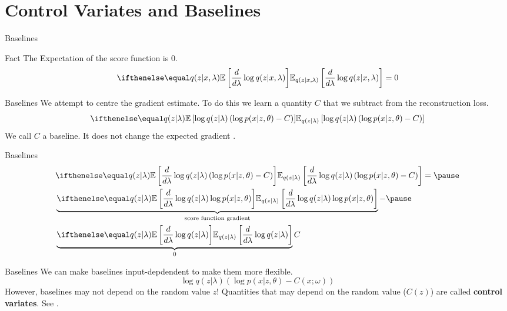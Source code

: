 \documentclass[14pt]{beamer}
\begin{document}
\section{Control Variates and Baselines}

\begin{frame}
\tableofcontents[currentsection]
\end{frame}

\begin{frame}{Baselines}
\begin{block}{Fact}
The Expectation of the score function is 0. 
\pause
\begin{equation*}
\E[q(z|x,\lambda)]{\frac{d}{d\lambda} \log q(z|x,\lambda)} = 0
\end{equation*}
\end{block}
\end{frame}

\begin{frame}{Baselines}
We attempt to centre the gradient estimate. To do this we learn a quantity $ C $ that we subtract
from the reconstruction loss.
\begin{equation*}
\E[q(z|\lambda) ]{\log q(z|\lambda) \left( \log p(x|z,\theta) - C \right)}
\end{equation*}
We call $ C $ a baseline. It does not change the expected gradient \citep{Williams:1992}.
\end{frame}

\begin{frame}{Baselines}
 \begin{equation*}
\begin{aligned}
&\E[q(z|\lambda)]{\frac{d}{d\lambda}\log q(z|\lambda) \left( \log p(x|z,\theta) - C \right)} = \pause \\
&\underbrace{\E[q(z|\lambda)]{\frac{d}{d\lambda}\log q(z|\lambda)  \log p(x|z,\theta)}}_{\text{score function gradient}}  -
\pause \\
&\underbrace{\E[q(z|\lambda)]{\frac{d}{d\lambda}\log q(z|\lambda)}}_{0}C
\end{aligned}
\end{equation*}
\end{frame}

\begin{frame}{Baselines}
We can make baselines input-depdendent to make them more flexible.
\begin{equation*}
\log q(z|\lambda) \left( \log p(x|z,\theta) - C(x; \omega) \right)
\end{equation*}
However, baselines may not depend on the random value $ z $! Quantities that may depend on the
random value ($ C(z) $) are called \textbf{control variates}. See \cite{PaisleyEtAl:2012, RanganathEtAl:2014,GregorEtAl:2014}.
\end{frame}
\end{document}
